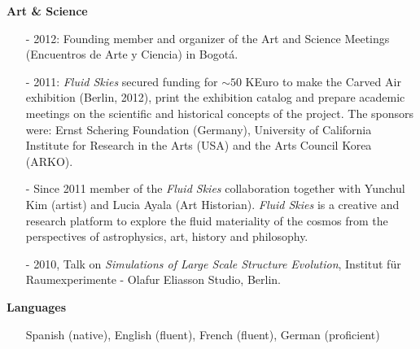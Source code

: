 \documentclass[9pt]{article}
\begin{document}
{\bf Art \& Science}
\begin{itemize}
\item [-] 2012: Founding member and organizer of the Art and Science Meetings (Encuentros de Arte y Ciencia) in Bogot\'a.
\item [-] 2011: {\it Fluid Skies} secured funding for $\sim 50$ KEuro
  to make the Carved Air exhibition (Berlin, 2012), print the
  exhibition catalog and prepare academic meetings on the scientific
  and historical concepts of the project. The sponsors were: Ernst
  Schering Foundation (Germany), University of California Institute
  for Research in the Arts (USA) and the Arts Council Korea (ARKO).  
\item [-] Since 2011 member of the {\it Fluid Skies} collaboration
  together with Yunchul Kim (artist) and Lucia Ayala (Art
  Historian). {\it Fluid Skies} is a creative and research platform to
  explore the fluid materiality of the cosmos from the perspectives of
  astrophysics, art, history and philosophy. 
\item [-] 2010, Talk on {\it Simulations of Large Scale Structure
  Evolution}, Institut f\"ur Raumexperimente - Olafur Eliasson Studio,
  Berlin.  
\end{itemize}


{\bf Languages}
\begin{itemize}
\item[]Spanish (native), English (fluent), French (fluent), German (proficient)
\end{itemize}

\end{document}
